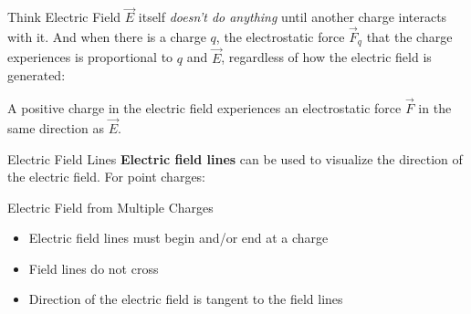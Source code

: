 \documentclass[12pt,aspectratio=169]{beamer}
\begin{document}
\begin{frame}{Think Electric Field}
  $\vec E$ itself \emph{doesn't do anything} until another charge interacts with
  it. And when there is a charge $q$, the electrostatic force $\vec F_q$ that
  the charge experiences is proportional to $q$ and $\vec E$, regardless of how
  the electric field is generated:


  A positive charge in the electric field experiences an electrostatic force
  $\vec F$ in the same direction as $\vec E$.
\end{frame}



\begin{frame}{Electric Field Lines}
  \textbf{Electric field lines} can be used to visualize the direction of the
  electric field. For point charges:
  \begin{center}
    \hspace{.2in}
  \end{center}
\end{frame}



\begin{frame}{Electric Field from Multiple Charges}
  \begin{center}
  \end{center}
  \begin{itemize}
  \item Electric field lines must begin and/or end at a charge
  \item Field lines do not cross
  \item Direction of the electric field is tangent to the field lines
  \end{itemize}
\end{frame}
\end{document}

